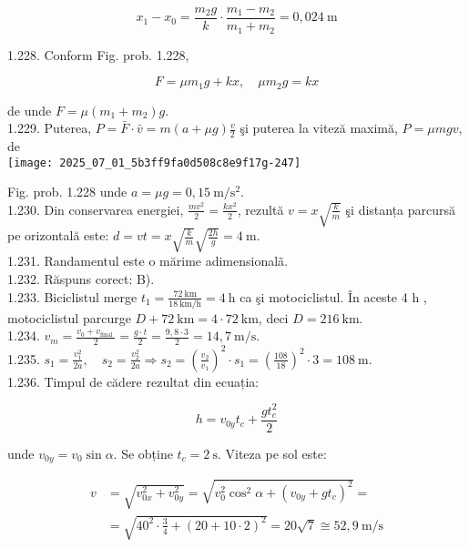 $$
x_{1}-x_{0}=\frac{m_{2} g}{k} \cdot \frac{m_{1}-m_{2}}{m_{1}+m_{2}}=0,024 \mathrm{~m}
$$

1.228. Conform Fig. prob. 1.228,

$$
F=\mu m_{1} g+k x, \quad \mu m_{2} g=k x
$$

de unde $F=\mu\left(m_{1}+m_{2}\right) g$.\\
1.229. Puterea, $P=\bar{F} \cdot \bar{v}=m(a+\mu g) \frac{v}{2}$ şi puterea la viteză maximă, $P=\mu m g v$, de\\
\texttt{[image: 2025\_07\_01\_5b3ff9fa0d508c8e9f17g-247]}

Fig. prob. 1.228 unde $a=\mu g=0,15 \mathrm{~m} / \mathrm{s}^{2}$.\\
1.230. Din conservarea energiei, $\frac{m v^{2}}{2}=\frac{k x^{2}}{2}$, rezultă $v=x \sqrt{\frac{k}{m}}$ şi distanța parcursă pe orizontală este: $d=v t=x \sqrt{\frac{k}{m}} \sqrt{\frac{2 h}{g}}=4 \mathrm{~m}$.\\
1.231. Randamentul este o mărime adimensionalã.\\
1.232. Răspuns corect: B).\\
1.233. Biciclistul merge $t_{1}=\frac{72 \mathrm{~km}}{18 \mathrm{~km} / \mathrm{h}}=4 \mathrm{~h}$ ca şi motociclistul. În aceste 4 h , motociclistul parcurge $D+72 \mathrm{~km}=4 \cdot 72 \mathrm{~km}$, deci $D=216 \mathrm{~km}$.\\
1.234. $v_{m}=\frac{v_{0}+v_{\text {final }}}{2}=\frac{g \cdot t}{2}=\frac{9,8 \cdot 3}{2}=14,7 \mathrm{~m} / \mathrm{s}$.\\
1.235. $s_{1}=\frac{v_{1}^{2}}{2 a}, \quad s_{2}=\frac{v_{2}^{2}}{2 a} \Rightarrow s_{2}=\left(\frac{v_{2}}{v_{1}}\right)^{2} \cdot s_{1}=\left(\frac{108}{18}\right)^{2} \cdot 3=108 \mathrm{~m}$.\\
1.236. Timpul de cădere rezultat din ecuația:

$$
h=v_{0 y} t_{c}+\frac{g t_{c}^{2}}{2}
$$

unde $v_{0 y}=v_{0} \sin \alpha$. Se obține $t_{c}=2 \mathrm{~s}$. Viteza pe sol este:

$$
\begin{aligned}
v & =\sqrt{v_{0 x}^{2}+v_{0 y}^{2}}=\sqrt{v_{0}^{2} \cos ^{2} \alpha+\left(v_{0 y}+g t_{c}\right)^{2}}= \\
& =\sqrt{40^{2} \cdot \frac{3}{4}+(20+10 \cdot 2)^{2}}=20 \sqrt{7} \cong 52,9 \mathrm{~m} / \mathrm{s}
\end{aligned}
$$

